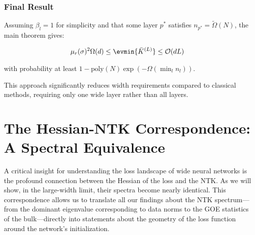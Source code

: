 \subsubsection{Final Result}

Assuming $\beta_l = 1$ for simplicity and that some layer $p^*$ satisfies $n_{p^*} = \tilde{\Omega}(N)$, the main theorem gives:

\begin{align}
\mu_r(\sigma)^2 \Omega(d) \leq \evmin{\bar{K}^{(L)}} \leq \mathcal{O}(d L)
\end{align}

with probability at least $1 - \text{poly}(N) \exp(-\Omega(\min_l n_l))$.

This approach significantly reduces width requirements compared to classical methods, requiring only one wide layer rather than all layers.









\newpage
\section{The Hessian-NTK Correspondence: A Spectral Equivalence}

A critical insight for understanding the loss landscape of wide neural networks is the profound connection between the Hessian of the loss and the NTK. As we will show, in the large-width limit, their spectra become nearly identical. This correspondence allows us to translate all our findings about the NTK spectrum—from the dominant eigenvalue corresponding to data norms to the GOE statistics of the bulk—directly into statements about the geometry of the loss function around the network's initialization.

